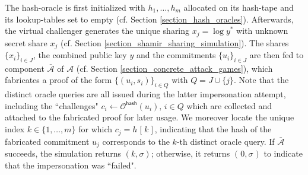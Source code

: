 \documentclass[psamsfonts, reqno]{amsart}
\theoremstyle{definition}
\theoremstyle{remark}
\numberwithin{equation}{section}
\begin{document}
\noindent
The hash-oracle is first initialized with $h_1, \dots, h_m$
allocated on its hash-tape and its lookup-tables set to empty
(cf. Section \ref{section_hash_oracles}).
Afterwards, the virtual challenger generates the unique sharing
$x_j = \log y^*$
with unknown secret share $x_j$
(cf. Section \ref{section_shamir_sharing_simulation}).
The shares $\{x_i\}_{i \in J}$, the combined
public key $y$ and the commitments $\{u_i\}_{i \in J}$
are then fed to component $\mathcal{\bar{A}}$ of $\mathcal{A}$
(cf. Section \ref{section_concrete_attack_games}),
which fabricates a proof of the form
$\{(u_i, s_i)\}_{i \in Q}$ with $Q = J \cup \{j\}$.
Note that the distinct oracle queries are all issued
during the latter impersonation attempt,
including the ``challenges"
$c_i \leftarrow \mathcal{O}^{\mathsf{hash}}(u_i),\hspace{2pt} i \in Q$
which are collected and attached to the fabricated
proof for later usage.
We moreover locate the unique index $k \in \{1, \dots, m\}$
for which $c_j = h\hspace{1pt}[\hspace{1pt}k\hspace{1pt}]$, indicating that the hash of the fabricated commitment
$u_j$ corresponds to the $k$-th distinct oracle query.
If $\mathcal{\bar{A}}$ succeeds,
the simulation returns $(k, \sigma)$; otherwise, it
returns $(\hspace{1pt}0, \sigma\hspace{1pt})$
to indicate that the impersonation was ``failed".
\end{document}
